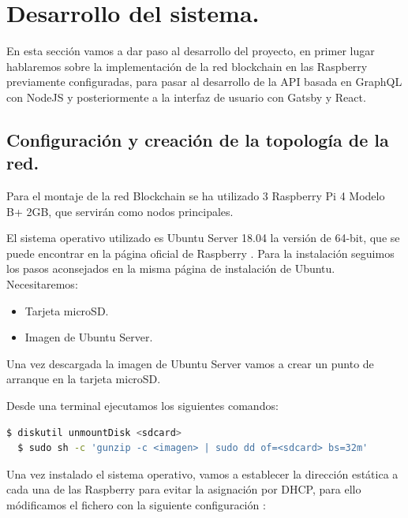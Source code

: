 \section{Desarrollo del sistema.}

En esta sección vamos a dar paso al desarrollo del proyecto, en primer lugar hablaremos sobre la implementación de la red
blockchain en las Raspberry previamente configuradas, para pasar al desarrollo de la API basada en GraphQL con NodeJS y 
posteriormente a la interfaz de usuario con Gatsby y React.  

\subsection{Configuración y creación de la topología de la red.}

Para el montaje de la red Blockchain se ha utilizado 3 Raspberry Pi 4 Modelo B+ 2GB, que servirán como nodos principales.

\vspace{5mm}

\noindent El sistema operativo utilizado es Ubuntu Server 18.04 \cite{ubuntu-rasp} la versión de 64-bit, que se puede 
encontrar en la página oficial de Raspberry \cite{rasp-official-page}. Para la instalación seguimos los pasos aconsejados 
en la misma página de instalación de Ubuntu. Necesitaremos:

\begin{itemize}
  \item Tarjeta microSD.
  \item Imagen de Ubuntu Server.
\end{itemize}

\noindent Una vez descargada la imagen de Ubuntu Server vamos a crear un punto de arranque en la tarjeta microSD.

\vspace{5mm}

\noindent Desde una terminal ejecutamos los siguientes comandos:

\begin{lstlisting}[language=bash]
  $ diskutil unmountDisk <sdcard>
  $ sudo sh -c 'gunzip -c <imagen> | sudo dd of=<sdcard> bs=32m'
\end{lstlisting}

\noindent Una vez instalado el sistema operativo, vamos a establecer la dirección estática a cada una de las Raspberry
para evitar la asignación por DHCP, para ello módificamos el fichero  con la 
siguiente configuración \cite{configure-static-ip}:

